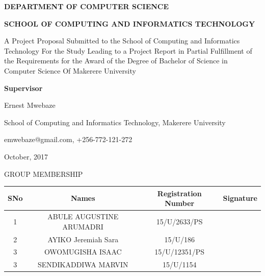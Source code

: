 \documentclass[12pt]{article}
\begin{document}
	\begin{center} \begin{Large} \textbf {DEPARTMENT OF COMPUTER SCIENCE} \end{Large}  \end{center}
	\begin{center} \begin{Large} \textbf {SCHOOL OF COMPUTING AND INFORMATICS TECHNOLOGY\\[1in]} \end{Large}  \end{center}
	\begin{center}A Project Proposal Submitted to the School of Computing and Informatics Technology
For the Study Leading to a Project Report in Partial Fulfillment of the
Requirements for the Award of the Degree of Bachelor of Science in Computer Science
Of Makerere University  \end{center}
\begin{center} \begin{Large} \textbf { Supervisor} \end{Large}  \end{center}
\begin{center} \begin{Large} Ernest Mwebaze \end{Large}  \end{center}	
\begin{center} \begin{Large} School of Computing and Informatics Technology, Makerere University \end{Large}  \end{center}
\begin{center} \begin{Large} emwebaze@gmail.com, +256-772-121-272 \end{Large}  \end{center}
\begin{center} \begin{Large}October, 2017 \end{Large}  \end{center}
\newpage
\begin{center}\begin{Large}GROUP MEMBERSHIP \end{Large} \end{center}

\begin{tabular} {|c|c|c|c|}
\hline
SNo & Names & Registration  Number & Signature \\ \hline
1 & ABULE AUGUSTINE ARUMADRI &  15/U/2633/PS &  \\ \hline
2 & AYIKO Jeremiah Sara &  15/U/186 & \\ \hline
3 & OWOMUGISHA ISAAC &  15/U/12351/PS & \\ \hline
3 & SENDIKADDIWA MARVIN &  15/U/1154 & \\ \hline
\end{tabular}
\newpage
\tableofcontents
\newpage
\end{document}
